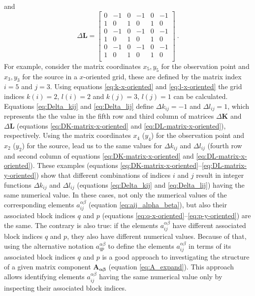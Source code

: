 \documentclass[manuscript,noblind]{geophysics}
\begin{document}
and
\begin{equation}
	\Delta\mathbf{L} = \begin{bmatrix}
		0 &  -1 &   0 &  -1 &   0 &  -1 \\
		1 &   0 &   1 &   0 &   1 &   0 \\
		0 &  -1 &   0 &  -1 &   0 &  -1 \\
		1 &   0 &   1 &   0 &   1 &   0 \\
		0 &  -1 &   0 &  -1 &   0 &  -1 \\
		1 &   0 &   1 &   0 &   1 &   0 \\
	\end{bmatrix} \: .
	\label{eq:DL-matrix-y-oriented}
\end{equation}
For example, consider the matrix coordinates $x_{5}, y_{5}$ for the observation point and $x_{3}, y_{3}$ for the source in a $x$-oriented grid, these are defined by the matrix index $i = 5$ and $j = 3$.
Using equations \ref{eq:k-x-oriented} and \ref{eq:l-x-oriented} the grid indices $k(i) = 2$, $l(i) = 2$ and $k(j) = 3$, $l(j) = 1$ can be calculated. Equations \ref{eq:Delta_kij} and \ref{eq:Delta_lij} define $\Delta k_{ij} = -1$ and $\Delta l_{ij} = 1$, which represents the the value in the fifth row and third column of matrices $\Delta\mathbf{K}$ and $\Delta\mathbf{L}$ (equations \ref{eq:DK-matrix-x-oriented} and \ref{eq:DL-matrix-x-oriented}), respectively. Using the matrix coordinates $x_{4}$ ($y_{4}$) for the observation point and $x_{2}$ ($y_{2}$) for the source, lead us to the same values for $\Delta k_{ij}$ and $\Delta l_{ij}$ (fourth row and second column of equations \ref{eq:DK-matrix-x-oriented} and \ref{eq:DL-matrix-x-oriented}).
These examples (equations \ref{eq:DK-matrix-x-oriented}--\ref{eq:DL-matrix-y-oriented})
show that different combinations of indices $i$ and $j$ result in integer functions 
$\Delta k_{ij}$ and $\Delta l_{ij}$ (equations \ref{eq:Delta_kij} and \ref{eq:Delta_lij}) 
having the same numerical value. In these cases, not only the numerical values of
the corresponding elements $a^{\alpha\beta}_{ij}$ (equation \ref{eq:aij_alpha_beta}),
but also their associated block indices $q$ and $p$ (equations 
\ref{eq:q-x-oriented}--\ref{eq:p-y-oriented}) are the same.
The contrary is also true: if the elements $a^{\alpha\beta}_{ij}$ have different 
associated block indices $q$ and $p$, they also have different numerical values.
Because of that, using the alternative notation $a^{\alpha\beta}_{qp}$ to define the elements 
$a^{\alpha\beta}_{ij}$ in terms of its associated block indices $q$ and $p$ is a good
approach to investigating the structure of a given matrix component 
$\mathbf{A_{\boldsymbol{\alpha\beta}}}$ (equation \ref{eq:A_expand}).
This approach allows identifying elements $a^{\alpha\beta}_{ij}$ having the same numerical
value only by inspecting their associated block indices.
\end{document}
